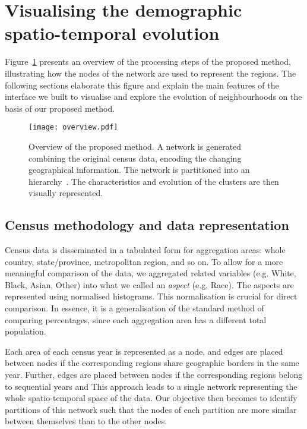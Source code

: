 \section{Visualising the demographic spatio-temporal evolution}
\label{sec:method}
Figure~\ref{fig:overview} presents an overview of the processing steps of the
proposed method, illustrating how the nodes of the network are used to represent
the regions. The following sections elaborate this figure and explain the main
features of the interface we built to visualise and explore the evolution of
neighbourhoods on the basis of our proposed method.


\begin{figure}
    \centering 
    \texttt{[image: overview.pdf]}
    \caption{Overview of the proposed method. A network is generated combining the
        original census data, encoding the changing geographical information.
        The network is partitioned into an hierarchy~\citep{markus2017}. The
        characteristics and evolution of the clusters are then visually
        represented.
        \label{fig:overview}}
\end{figure}


\subsection{Census methodology and data representation}

Census data is disseminated in a tabulated form for aggregation areas: whole
country, state/province, metropolitan region, and so on. To allow for a more
meaningful comparison of the data, we aggregated related variables (e.g. White,
Black, Asian, Other) into what we called an \emph{aspect} (e.g. Race). The
aspects are represented using normalised histograms. This normalisation is
crucial for direct comparison. In essence, it is a generalisation of the
standard method of comparing percentages, since each aggregation area has a
different total population.

Each area of each census year is represented as a node, and edges are placed
between nodes if the corresponding regions share geographic borders in the same
year. Further, edges are placed between nodes if the corresponding regions
belong to sequential years and  This approach
leads to a single network representing the whole spatio-temporal space of the
data. Our objective then becomes to identify partitions of this network such
that the nodes of each partition are more similar between themselves than to the
other nodes. 


